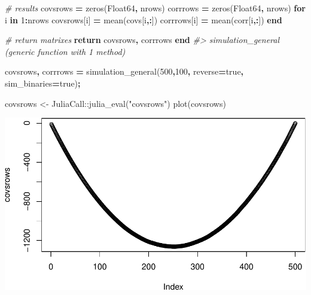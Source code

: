 \documentclass[
]{article}
\newenvironment{Shaded}{\begin{snugshade}}{\end{snugshade}}
\newcommand{\CommentTok}[1]{\textcolor[rgb]{0.56,0.35,0.01}{\textit{#1}}}
\newcommand{\DataTypeTok}[1]{\textcolor[rgb]{0.13,0.29,0.53}{#1}}
\newcommand{\ExtensionTok}[1]{#1}
\newcommand{\FloatTok}[1]{\textcolor[rgb]{0.00,0.00,0.81}{#1}}
\newcommand{\FunctionTok}[1]{\textcolor[rgb]{0.00,0.00,0.00}{#1}}
\newcommand{\KeywordTok}[1]{\textcolor[rgb]{0.13,0.29,0.53}{\textbf{#1}}}
\newcommand{\NormalTok}[1]{#1}
\newcommand{\OperatorTok}[1]{\textcolor[rgb]{0.81,0.36,0.00}{\textbf{#1}}}
\newcommand{\OtherTok}[1]{\textcolor[rgb]{0.56,0.35,0.01}{#1}}
\newcommand{\SpecialCharTok}[1]{\textcolor[rgb]{0.00,0.00,0.00}{#1}}
\newcommand{\StringTok}[1]{\textcolor[rgb]{0.31,0.60,0.02}{#1}}
\begin{document}
\begin{Shaded}
\begin{Highlighting}[]
    \CommentTok{\# results}
\NormalTok{    covsrows }\OperatorTok{=}\NormalTok{ zeros(}\DataTypeTok{Float64}\OperatorTok{,}\NormalTok{ nrows)}
\NormalTok{    corrrows }\OperatorTok{=}\NormalTok{ zeros(}\DataTypeTok{Float64}\OperatorTok{,}\NormalTok{ nrows)}
    \KeywordTok{for}\NormalTok{ i }\KeywordTok{in} \FloatTok{1}\OperatorTok{:}\NormalTok{nrows}
\NormalTok{        covsrows[i] }\OperatorTok{=}\NormalTok{ mean(covs[i}\OperatorTok{,:}\NormalTok{])}
\NormalTok{        corrrows[i] }\OperatorTok{=}\NormalTok{ mean(corr[i}\OperatorTok{,:}\NormalTok{])}
    \KeywordTok{end}

    \CommentTok{\# return matrixes}
    \KeywordTok{return}\NormalTok{ covsrows}\OperatorTok{,}\NormalTok{ corrrows}
\KeywordTok{end}
\CommentTok{\#\textgreater{} simulation\_general (generic function with 1 method)}

\NormalTok{covsrows}\OperatorTok{,}\NormalTok{ corrrows }\OperatorTok{=}\NormalTok{ simulation\_general(}\FloatTok{500}\OperatorTok{,}\FloatTok{100}\OperatorTok{,}\NormalTok{ reverse}\OperatorTok{=}\ExtensionTok{true}\OperatorTok{,}\NormalTok{ sim\_binaries}\OperatorTok{=}\ExtensionTok{true}\NormalTok{)}\OperatorTok{;}
\end{Highlighting}
\end{Shaded}

\begin{Shaded}
\begin{Highlighting}[]
\NormalTok{covsrows }\OtherTok{\textless{}{-}}\NormalTok{ JuliaCall}\SpecialCharTok{::}\FunctionTok{julia\_eval}\NormalTok{(}\StringTok{"covsrows"}\NormalTok{)}
\FunctionTok{plot}\NormalTok{(covsrows)}
\end{Highlighting}
\end{Shaded}

\includegraphics{./figures/unnamed-chunk-10-1.pdf}
\end{document}
